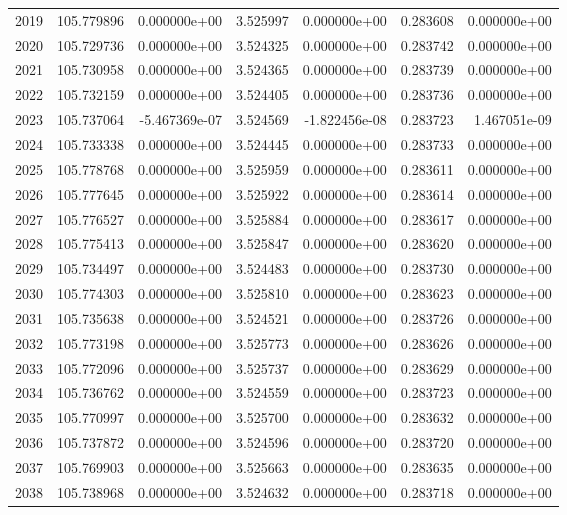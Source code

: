 \begin{tabular}{rrrrrrr}
2019 & 105.779896 &  0.000000e+00 &  3.525997 &  0.000000e+00 &    0.283608 &  0.000000e+00 \\
2020 & 105.729736 &  0.000000e+00 &  3.524325 &  0.000000e+00 &    0.283742 &  0.000000e+00 \\
2021 & 105.730958 &  0.000000e+00 &  3.524365 &  0.000000e+00 &    0.283739 &  0.000000e+00 \\
2022 & 105.732159 &  0.000000e+00 &  3.524405 &  0.000000e+00 &    0.283736 &  0.000000e+00 \\
2023 & 105.737064 & -5.467369e-07 &  3.524569 & -1.822456e-08 &    0.283723 &  1.467051e-09 \\
2024 & 105.733338 &  0.000000e+00 &  3.524445 &  0.000000e+00 &    0.283733 &  0.000000e+00 \\
2025 & 105.778768 &  0.000000e+00 &  3.525959 &  0.000000e+00 &    0.283611 &  0.000000e+00 \\
2026 & 105.777645 &  0.000000e+00 &  3.525922 &  0.000000e+00 &    0.283614 &  0.000000e+00 \\
2027 & 105.776527 &  0.000000e+00 &  3.525884 &  0.000000e+00 &    0.283617 &  0.000000e+00 \\
2028 & 105.775413 &  0.000000e+00 &  3.525847 &  0.000000e+00 &    0.283620 &  0.000000e+00 \\
2029 & 105.734497 &  0.000000e+00 &  3.524483 &  0.000000e+00 &    0.283730 &  0.000000e+00 \\
2030 & 105.774303 &  0.000000e+00 &  3.525810 &  0.000000e+00 &    0.283623 &  0.000000e+00 \\
2031 & 105.735638 &  0.000000e+00 &  3.524521 &  0.000000e+00 &    0.283726 &  0.000000e+00 \\
2032 & 105.773198 &  0.000000e+00 &  3.525773 &  0.000000e+00 &    0.283626 &  0.000000e+00 \\
2033 & 105.772096 &  0.000000e+00 &  3.525737 &  0.000000e+00 &    0.283629 &  0.000000e+00 \\
2034 & 105.736762 &  0.000000e+00 &  3.524559 &  0.000000e+00 &    0.283723 &  0.000000e+00 \\
2035 & 105.770997 &  0.000000e+00 &  3.525700 &  0.000000e+00 &    0.283632 &  0.000000e+00 \\
2036 & 105.737872 &  0.000000e+00 &  3.524596 &  0.000000e+00 &    0.283720 &  0.000000e+00 \\
2037 & 105.769903 &  0.000000e+00 &  3.525663 &  0.000000e+00 &    0.283635 &  0.000000e+00 \\
2038 & 105.738968 &  0.000000e+00 &  3.524632 &  0.000000e+00 &    0.283718 &  0.000000e+00 \\

\end{tabular}
